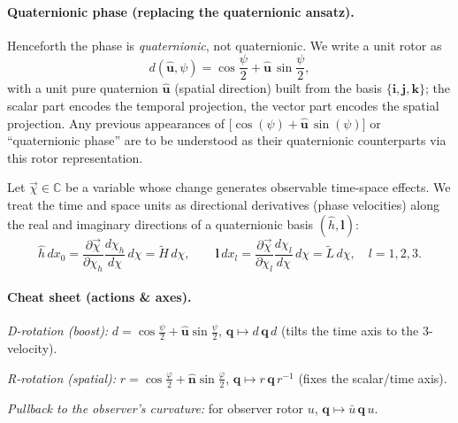 \documentclass[11pt]{article}
\numberwithin{equation}{section}
\providecommand{\uhat}{\hat{\mathbf u}}
\begin{document}
\paragraph{Quaternionic phase (replacing the quaternionic ansatz).}
Henceforth the phase is \emph{quaternionic}, not quaternionic. We write a unit rotor as
\begin{equation}
d(\hat{\mathbf u},\psi)=\cos\frac{\psi}{2}+\hat{\mathbf u}\,\sin\frac{\psi}{2},
\end{equation}
with a unit pure quaternion $\hat{\mathbf u}$ (spatial direction) built from the basis
$\{\mathbf i,\mathbf j,\mathbf k\}$; the scalar part encodes the temporal projection,
the vector part encodes the spatial projection. Any previous appearances of
$\bigl[\cos(\psi)+\uhat\,\sin(\psi)\bigr]$ or ``quaternionic phase'' are to be understood as their quaternionic
counterparts via this rotor representation.

Let $\vec{\chi}\in\mathbb{C}$ be a variable whose change generates observable time-space effects. We treat the time and space units as directional derivatives (phase velocities) along the real and imaginary directions of a quaternionic basis $(\hat{h},\mathbf{l})$:
\begin{equation}
\hat{h}\,dx_0=\frac{\partial\vec{\chi}}{\partial\chi_h}\frac{d\chi_h}{d\chi}\,d\chi
=\tilde{H}\,d\chi,\qquad
\mathbf{l}\,dx_l=\frac{\partial\vec{\chi}}{\partial\chi_l}\frac{d\chi_l}{d\chi}\,d\chi
=\tilde{L}\,d\chi,\quad l=1,2,3.
\label{eq:11}
\end{equation}

\paragraph{Cheat sheet (actions \& axes).}
\emph{D-rotation (boost):} $d=\cos\frac{\psi}{2}+\hat{\mathbf u}\sin\frac{\psi}{2}$,\quad
$\displaystyle \mathbf q \mapsto d\,\mathbf q\,d$ (tilts the time axis to the 3-velocity).

\emph{R-rotation (spatial):} $r=\cos\frac{\varphi}{2}+\hat{\mathbf n}\sin\frac{\varphi}{2}$,\quad
$\displaystyle \mathbf q \mapsto r\,\mathbf q\,r^{-1}$ (fixes the scalar/time axis).

\emph{Pullback to the observer's curvature:} for observer rotor $u$,
$\displaystyle \mathbf q \mapsto \bar u\, \mathbf q\, u$.
\end{document}
